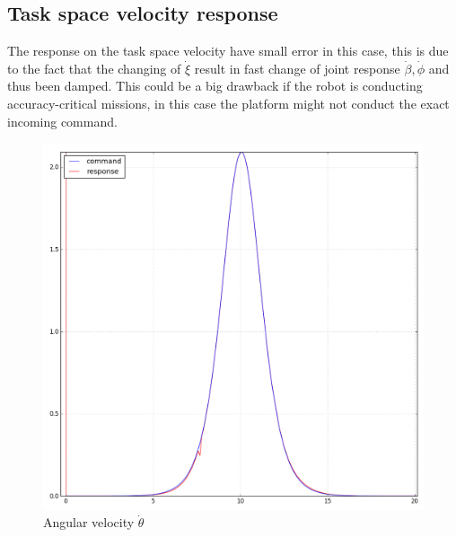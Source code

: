 \subsection{Task space velocity response}
The response on the task space velocity have small error in this case, this is due to the fact that the changing of $\dot{\xi}$ result in fast change of joint response $\dot{\beta}, \dot{\phi}$ and thus been damped. This could be a big drawback if the robot is conducting accuracy-critical missions, in this case the platform might not conduct the exact incoming command.
\begin{figure}[H]
    \centering
    \includegraphics[width=\textwidth]{Figures/360_t.png}
    \caption{Angular velocity $\dot{\theta}$}
    \label{fig:my_label}
\end{figure}

